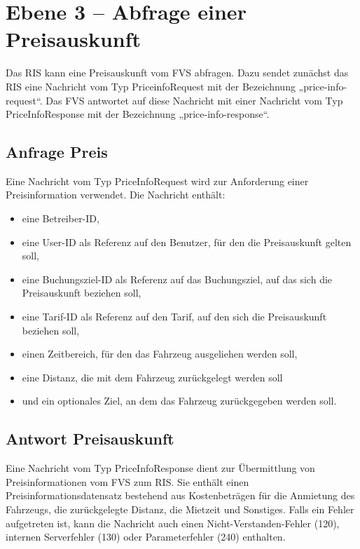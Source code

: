 \section{Ebene 3 -- Abfrage einer Preisauskunft}
Das RIS kann eine Preisauskunft vom FVS abfragen. Dazu sendet zunächst das RIS eine Nachricht vom Typ PriceinfoRequest mit der Bezeichnung „price-info-request“. Das FVS antwortet auf diese Nachricht mit einer Nachricht vom Typ PriceInfoResponse mit der Bezeichnung „price-info-response“.



\subsection{Anfrage Preis}
Eine Nachricht vom Typ PriceInfoRequest wird zur Anforderung einer Preisinformation verwendet. Die Nachricht enthält:
\begin{itemize}
\item eine Betreiber-ID,
\item eine User-ID als Referenz auf den Benutzer, für den die Preisauskunft gelten soll,
\item eine Buchungsziel-ID als Referenz auf das Buchungsziel, auf das sich die Preisauskunft beziehen soll,
\item eine Tarif-ID als Referenz auf den Tarif, auf den sich die Preisauskunft beziehen soll,
\item einen Zeitbereich, für den das Fahrzeug ausgeliehen werden soll,
\item eine Distanz, die mit dem Fahrzeug zurückgelegt werden soll
\item und ein optionales Ziel, an dem das Fahrzeug zurückgegeben werden soll.
\end{itemize}



\subsection{Antwort Preisauskunft}
Eine Nachricht vom Typ PriceInfoResponse dient zur Übermittlung von Preisinformationen vom FVS zum RIS. Sie enthält einen Preisinformationsdatensatz bestehend aus Kostenbeträgen für die Anmietung des Fahrzeugs, die zurückgelegte Distanz, die Mietzeit und Sonstiges. Falls ein Fehler aufgetreten ist, kann die Nachricht auch einen Nicht-Verstanden-Fehler (120), internen Serverfehler (130) oder Parameterfehler (240) enthalten.

